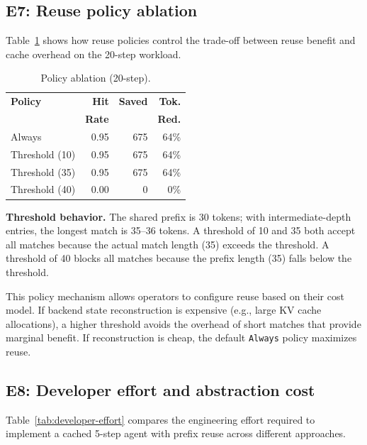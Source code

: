 \documentclass[10pt,twocolumn]{article}
\begin{document}
\subsection{E7: Reuse policy ablation}

Table~\ref{tab:policy-ablation} shows how reuse policies control the trade-off between reuse benefit and cache overhead on the 20-step workload.

\begin{table}[t]
\centering
{\small
\caption{Policy ablation (20-step).}
\label{tab:policy-ablation}
\begin{tabular}{@{}lrrr@{}}
\toprule
\textbf{Policy} & \textbf{Hit} & \textbf{Saved} & \textbf{Tok.} \\
 & \textbf{Rate} & & \textbf{Red.} \\
\midrule
Always           & 0.95 & 675 & 64\% \\
Threshold (10)   & 0.95 & 675 & 64\% \\
Threshold (35)   & 0.95 & 675 & 64\% \\
Threshold (40)   & 0.00 &   0 &  0\% \\
\bottomrule
\end{tabular}
}
\end{table}

\textbf{Threshold behavior.} The shared prefix is 30 tokens; with intermediate-depth entries, the longest match is 35--36 tokens. A threshold of 10 and 35 both accept all matches because the actual match length (35) exceeds the threshold. A threshold of 40 blocks all matches because the prefix length (35) falls below the threshold.

This policy mechanism allows operators to configure reuse based on their cost model. If backend state reconstruction is expensive (e.g., large KV cache allocations), a higher threshold avoids the overhead of short matches that provide marginal benefit. If reconstruction is cheap, the default \texttt{Always} policy maximizes reuse.

\subsection{E8: Developer effort and abstraction cost}

Table~\ref{tab:developer-effort} compares the engineering effort required to implement a cached 5-step agent with prefix reuse across different approaches.
\end{document}
